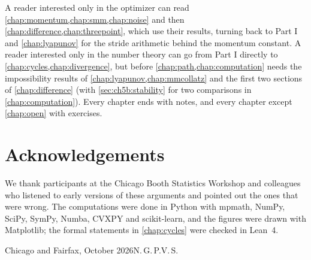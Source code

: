 A reader interested only in the optimizer can read \cref{chap:momentum,chap:smm,chap:noise} and then \cref{chap:difference,chap:threepoint}, which use their results, turning back to Part I and \cref{chap:lyapunov} for the stride arithmetic behind the momentum constant. A reader interested only in the number theory can go from Part I directly to \cref{chap:cycles,chap:divergence}, but before \cref{chap:path,chap:computation} needs the impossibility results of \cref{chap:lyapunov,chap:mmcollatz} and the first two sections of \cref{chap:difference} (with \cref{sec:ch5b:stability} for two comparisons in \cref{chap:computation}). Every chapter ends with notes, and every chapter except \cref{chap:open} with exercises.

\section*{Acknowledgements}

We thank participants at the Chicago Booth Statistics Workshop and colleagues
who listened to early versions of these arguments and pointed out the ones
that were wrong. The computations were done in Python with mpmath, NumPy,
SciPy, SymPy, Numba, CVXPY and scikit-learn, and the figures were drawn with Matplotlib; the formal statements in \cref{chap:cycles} were checked in
Lean~4.

\vspace{12pt}
\noindent Chicago and Fairfax, October 2026\hfill N.\,G.\,P.\quad V.\,S.
